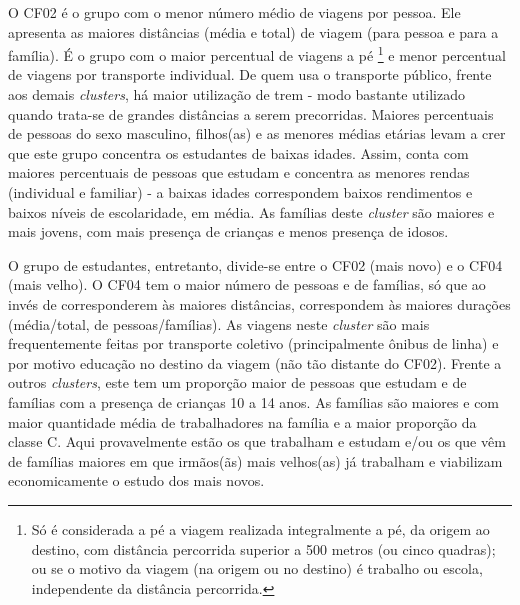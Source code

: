 O CF02 é o grupo com o menor número médio de viagens por pessoa. Ele apresenta as maiores distâncias (média e total) de viagem (para pessoa e para a família).
É o grupo com o maior percentual de viagens a pé%
\footnote{Só é considerada a pé a viagem realizada integralmente a pé, da origem ao destino, com distância percorrida superior a 500 metros (ou cinco quadras); ou se o motivo da viagem (na origem ou no destino) é trabalho ou escola, independente da distância percorrida.} 
e menor percentual de viagens por transporte individual.
De quem usa o transporte público, frente aos demais \textit{clusters}, há maior utilização de trem - modo bastante utilizado quando trata-se de grandes distâncias a serem precorridas.
Maiores percentuais de pessoas do sexo masculino, filhos(as) e as menores médias etárias levam a crer que este grupo concentra os estudantes de baixas idades.
Assim, conta com maiores percentuais de pessoas que estudam e concentra as menores rendas (individual e familiar) - a baixas idades correspondem baixos rendimentos e baixos níveis de escolaridade, em média.
As famílias deste \textit{cluster} são maiores e mais jovens, com mais presença de crianças e menos presença de idosos.

O grupo de estudantes, entretanto, divide-se entre o CF02 (mais novo) e o CF04 (mais velho).
O CF04 tem o maior número de pessoas e de famílias, só que ao invés de corresponderem às maiores distâncias, correspondem às maiores durações (média/total, de pessoas/famílias).
As viagens neste \textit{cluster} são mais frequentemente feitas por transporte coletivo (principalmente ônibus de linha) e por motivo educação no destino da viagem (não tão distante do CF02).
Frente a outros \textit{clusters}, este tem um proporção maior de pessoas que estudam e de famílias com a presença de crianças 10 a 14 anos.
As famílias são maiores e com maior quantidade média de trabalhadores na família e a maior proporção da classe C.
Aqui provavelmente estão os que trabalham e estudam e/ou os que vêm de famílias maiores em que irmãos(ãs) mais velhos(as) já trabalham e viabilizam economicamente o estudo dos mais novos.


